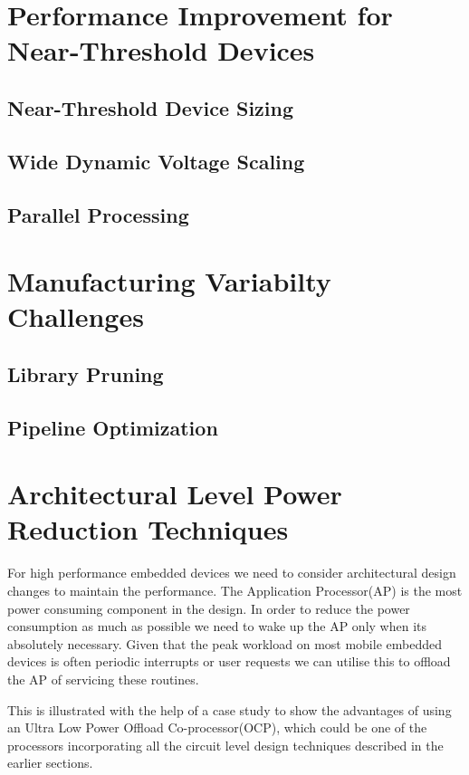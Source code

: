 \documentclass[conference]{IEEEtran}
\begin{document}
\section{Performance Improvement for Near-Threshold Devices} \label{sec:Perf_challenges}

\subsection{Near-Threshold Device Sizing}
\subsection{Wide Dynamic Voltage Scaling}
\subsection{Parallel Processing}

\section{Manufacturing Variabilty Challenges} \label{sec:Variablity}

\subsection{Library Pruning}
\subsection{Pipeline Optimization}

\section{Architectural Level Power Reduction Techniques} \label{sec:Case_Study}
For high performance embedded devices we need to consider architectural design
changes to maintain the performance. The Application Processor(AP) is the most
power consuming component in the design. In order to reduce the power consumption as
much as possible we need to wake up the AP only when its absolutely necessary.
Given that the peak workload on most mobile embedded devices is often
periodic interrupts or user requests we can utilise this to offload the
AP of servicing these routines.

This is illustrated with the help of a case study to show the advantages of
using an Ultra Low Power Offload Co-processor(OCP), which could be one of the
processors incorporating all the circuit level design techniques described in the earlier sections.
\end{document}
